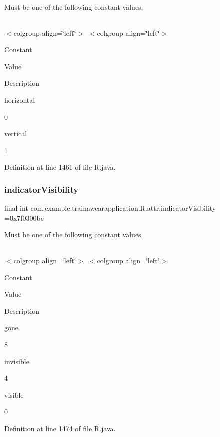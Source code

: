 Must be one of the following constant values.

\tabulinesep=1mm
\begin{longtabu}spread 0pt [c]{*{0}{|X[-1]}|}
\hline
\end{longtabu}
$<$colgroup align=\char`\"{}left\char`\"{}$>$ $<$colgroup align=\char`\"{}left\char`\"{}$>$ 

Constant

Value

Description 

horizontal

0

vertical

1

Definition at line 1461 of file R.\+java.

\mbox{\label{classcom_1_1example_1_1trainawearapplication_1_1_r_1_1attr_a484a75b7a68b24729c613f4b21412d0b}} 
\subsubsection{\texorpdfstring{indicatorVisibility}{indicatorVisibility}}
{\footnotesize\ttfamily final int com.\+example.\+trainawearapplication.\+R.\+attr.\+indicator\+Visibility =0x7f0300bc\hspace{0.3cm}{\ttfamily [static]}}

Must be one of the following constant values.

\tabulinesep=1mm
\begin{longtabu}spread 0pt [c]{*{0}{|X[-1]}|}
\hline
\end{longtabu}
$<$colgroup align=\char`\"{}left\char`\"{}$>$ $<$colgroup align=\char`\"{}left\char`\"{}$>$ 

Constant

Value

Description 

gone

8

invisible

4

visible

0

Definition at line 1474 of file R.\+java.

